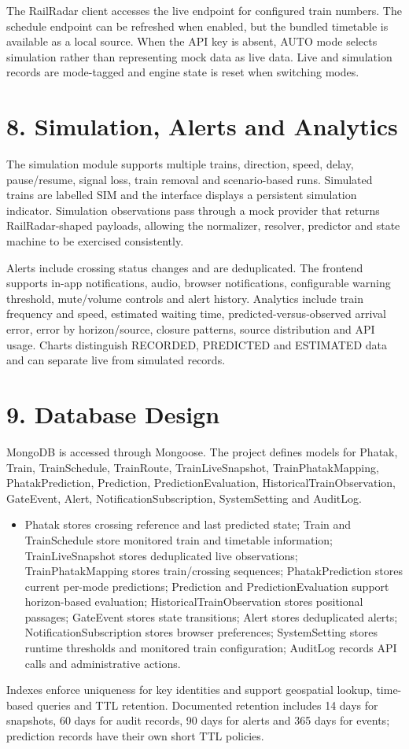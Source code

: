 \documentclass[12pt,a4paper]{report}
\begin{document}
The RailRadar client accesses the live endpoint for configured train numbers. The schedule endpoint can be refreshed when enabled, but the bundled timetable is available as a local source. When the API key is absent, AUTO mode selects simulation rather than representing mock data as live data. Live and simulation records are mode-tagged and engine state is reset when switching modes.

\chapter{8. Simulation, Alerts and Analytics}
The simulation module supports multiple trains, direction, speed, delay, pause/resume, signal loss, train removal and scenario-based runs. Simulated trains are labelled SIM and the interface displays a persistent simulation indicator. Simulation observations pass through a mock provider that returns RailRadar-shaped payloads, allowing the normalizer, resolver, predictor and state machine to be exercised consistently.

Alerts include crossing status changes and are deduplicated. The frontend supports in-app notifications, audio, browser notifications, configurable warning threshold, mute/volume controls and alert history. Analytics include train frequency and speed, estimated waiting time, predicted-versus-observed arrival error, error by horizon/source, closure patterns, source distribution and API usage. Charts distinguish RECORDED, PREDICTED and ESTIMATED data and can separate live from simulated records.

\chapter{9. Database Design}
MongoDB is accessed through Mongoose. The project defines models for Phatak, Train, TrainSchedule, TrainRoute, TrainLiveSnapshot, TrainPhatakMapping, PhatakPrediction, Prediction, PredictionEvaluation, HistoricalTrainObservation, GateEvent, Alert, NotificationSubscription, SystemSetting and AuditLog.

\begin{itemize}\item Phatak stores crossing reference and last predicted state; Train and TrainSchedule store monitored train and timetable information; TrainLiveSnapshot stores deduplicated live observations; TrainPhatakMapping stores train/crossing sequences; PhatakPrediction stores current per-mode predictions; Prediction and PredictionEvaluation support horizon-based evaluation; HistoricalTrainObservation stores positional passages; GateEvent stores state transitions; Alert stores deduplicated alerts; NotificationSubscription stores browser preferences; SystemSetting stores runtime thresholds and monitored train configuration; AuditLog records API calls and administrative actions.\end{itemize}
Indexes enforce uniqueness for key identities and support geospatial lookup, time-based queries and TTL retention. Documented retention includes 14 days for snapshots, 60 days for audit records, 90 days for alerts and 365 days for events; prediction records have their own short TTL policies.
\end{document}
